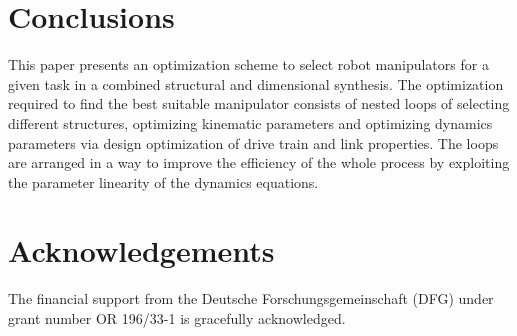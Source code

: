 \documentclass{svproc}
\begin{document}
\section{Conclusions}
\label{sec:Conclusion}


This paper presents an optimization scheme to select robot manipulators for a given task in a combined structural and dimensional synthesis.
The optimization required to find the best suitable manipulator consists of nested loops of selecting different structures, optimizing kinematic parameters and optimizing dynamics parameters via design optimization of drive train and link properties.
The loops are arranged in a way to improve the efficiency of the whole process by exploiting the parameter linearity of the dynamics equations.

\section*{Acknowledgements}

The financial support from the Deutsche Forschungsgemeinschaft (DFG) under grant number OR 196/33-1 is gracefully acknowledged.



\end{document}
